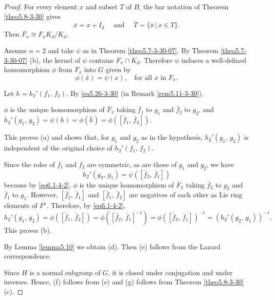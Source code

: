\documentclass[mathscr]{amsart}
\theoremstyle{theorem}
\theoremstyle{definition}
\numberwithin{equation}{section}
\def \({\left(}
\def \){\right)}
\def\[{\left[}
\def\]{\right]}
\def\Q{\mathbb{Q}}
\def\ol{\overline}
\begin{document}
\begin{proof}
For every element $x$ and subset $T$ of $B$, the bar notation of
Theorem \ref{theo5.8-3-30} gives
$$\bar x=x+I_d\quad\text{ and }\quad\overline{T}=\{\bar x\,|\,x\in T\}.$$
Then $\ol{F_\pi}\cong F_\pi K_d/K_d.$

Assume $n=2$ and take $\psi$ as in Theorem \ref{theo5.7-3-30-07}. By
Theorem \ref{theo5.7-3-30-07} (b), the kernel of $\psi$ contains
$F_\pi\cap K_d$. Therefore $\psi$ induces a well-defined
homomorphism $\phi$ from $\ol{F}_\pi$ into $G$ given by
$$\phi(\bar x)=\psi(x),\quad\text{for all $x$ in $F_\pi.$}$$

Let $h=h_2'(f_1,\,f_2)$. By \eqref{eq5.26-3-30} (in Remark
\ref{rem5.11-3-30}), %


\bigskip\qquad $\phi$ is the unique homomorphism of $\ol{F}_\pi$
taking $\bar f_1$ to $g_1$ and $\bar f_2$ to $g_2$, and
$h_2'(g_1,\,g_2)=\psi(h)=\phi(\bar h)=\phi\(\[\bar f_1,\,\bar
f_2\]\)$.\vspace{-1.02cm}
\begin{equation}\label{eq6.1-4-2}
\end{equation}
\bigskip

This proves (a) and shows that, for $g_1$ and $g_2$ as in the
hypothesis, $h_2'(g_1,\,g_2)$ is independent of the original choice
of $h_2'(f_1,\,f_2).$

Since the roles of $f_1$ and $f_2$ are symmetric, as are those of
$g_1$ and $g_2$, we have
$$h_2'(g_2,\,g_1)=\psi\(\[\bar f_2,\,\bar f_1\]\)$$
because by \eqref{eq6.1-4-2}, $\phi$ is the unique homomorphism of
$\ol{F}_\pi$ taking $\bar f_2$ to $g_2$ and $\bar f_1$ to $g_1.$
However, $\[\bar f_2,\, \bar f_1\]$ and $\[\bar f_1,\, \bar f_2\]$
are negatives of each other as Lie ring elements of $\ol{F^\star}.$
Therefore, by \eqref{eq6.1-4-2},
$$h_2'(g_1,\,g_2)=\phi\(\[\bar f_1,\,\bar f_2\]\)=\phi\(\[\bar f_2,\,\bar f_1\]^{-1}\)
=\phi\(\[\bar f_2,\,\bar f_1\]\)^{-1}=\(h_2'(g_2,\,g_1)\)^{-1}.$$
This proves (b).

By Lemma \ref{lemma5.10} we obtain (d). Then (e) follows from the
Lazard correspondence.

Since $H$ is a normal subgroup of $G$, it is closed under
conjugation and under inverses. Hence, (f) follows from (e) and (g)
follows from Theorem \ref{theo5.8-3-30} (c).


\end{proof}
\end{document}
